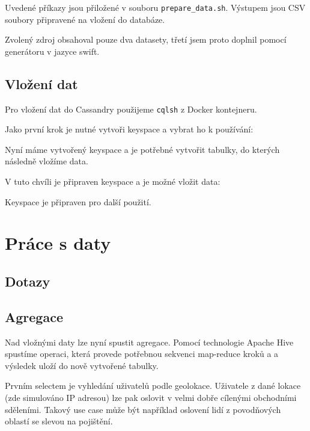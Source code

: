 \documentclass[czech]{article}
\begin{document}
Uvedené příkazy jsou přiložené v souboru \lstinline{prepare_data.sh}. Výstupem jsou CSV soubory připravené na vložení do databáze.

Zvolený zdroj obsahoval pouze dva datasety, třetí jsem proto doplnil pomocí generátoru v jazyce swift.

\subsection{Vložení dat}

Pro vložení dat do Cassandry použijeme \lstinline{cqlsh} z Docker kontejneru.

Jako první krok je nutné vytvoři keyspace a vybrat ho k používání:



Nyní máme vytvořený keyspace a je potřebné vytvořit tabulky, do kterých následně vložíme data.



V tuto chvíli je připraven keyspace a je možné vložit data:



Keyspace je připraven pro další použití.

\section{Práce s daty}

\subsection{Dotazy}

\subsection{Agregace}

Nad vložnými daty lze nyní spustit agregace. Pomocí technologie Apache Hive spustíme operaci, která provede potřebnou sekvenci map-reduce kroků a a výsledek uloží do nově vytvořené tabulky.

Prvním selectem je vyhledání uživatelů podle geolokace. Uživatele z dané lokace (zde simulováno IP adresou) lze pak oslovit v velmi dobře cílenými obchodními sděleními. Takový use case může být například oslovení lidí z povodňových oblastí se slevou na pojištění.
\end{document}
